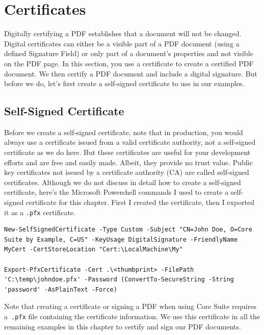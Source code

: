 \documentclass[american]{tufte-book}
\numberwithin{equation}{section}
\numberwithin{figure}{section}
\begin{document}
{\section{Certificates}

Digitally certifying a PDF establishes that a document will not be
changed. Digital certificates can either be a visible part of a PDF
document (using a defined Signature Field) or only part of a document's
properties and not visible on the PDF page. In this section, you use
a certificate to create a certified PDF document. We then certify
a PDF document and include a digital signature. But before we do,
let's first create a self-signed certificate to use in our examples.
\subsection{Self-Signed Certificate}
Before we create a self-signed certificate, note that in production,
you would always use a certificate issued from a valid certificate
authority, not a self-signed certificate as we do here. But these
certificates are useful for your development efforts and are free
and easily made. Albeit, they provide no trust value. Public key certificates
not issued by a certificate authority (CA) are called self-signed
certificates. Although we do not discuss in detail how to create a self-signed
certificate, here's the Microsoft Powershell commands I used to create
a self-signed certificate for this chapter. First I created the certificate,
then I exported it as a \texttt{.pfx} certificate.

\bgroup{}
\begin{lstlisting}[basicstyle={\footnotesize\ttfamily},breaklines=true]
New-SelfSignedCertificate -Type Custom -Subject "CN=John Doe, O=Core Suite by Example, C=US" -KeyUsage DigitalSignature -FriendlyName MyCert -CertStoreLocation "Cert:\LocalMachine\My"

Export-PfxCertificate -Cert .\<thumbprint> -FilePath 'C:\temp\johndoe.pfx' -Password (ConvertTo-SecureString -String 'password' -AsPlainText -Force)
\end{lstlisting}
\leavevmode\egroup

Note that creating a certificate or signing a PDF when using Core
Suite requires a\texttt{ .pfx} file containing the certificate information.
We use this certificate in all the remaining examples in this chapter
to certify and sign our PDF documents.

}
\end{document}
